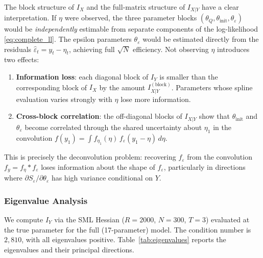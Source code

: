 \documentclass[12pt]{article}
\begin{document}
The block structure of $I_X$ and the full-matrix structure of $I_{X|Y}$
have a clear interpretation.
If $\eta$ were observed, the three parameter blocks
$(\theta_Q, \theta_{\text{init}}, \theta_\varepsilon)$ would be
\emph{independently} estimable from separate components of the
log-likelihood \eqref{eq:complete_ll}.
The epsilon parameters $\theta_\varepsilon$ would be estimated directly
from the residuals $\hat\varepsilon_t = y_t - \eta_t$, achieving full
$\sqrt{N}$ efficiency.
Not observing $\eta$ introduces two effects:
\begin{enumerate}
\item \textbf{Information loss}: each diagonal block of $I_Y$ is
  smaller than the corresponding block of $I_X$ by the amount
  $I_{X|Y}^{(\text{block})}$.
  Parameters whose spline evaluation varies strongly with $\eta$
  lose more information.
\item \textbf{Cross-block correlation}: the off-diagonal blocks of
  $I_{X|Y}$ show that $\theta_{\text{init}}$ and $\theta_\varepsilon$
  become correlated through the shared uncertainty about $\eta_1$
  in the convolution $f(y_1) = \int f_{\eta_1}(\eta)\, f_\varepsilon(y_1 - \eta)\, d\eta$.
\end{enumerate}

This is precisely the deconvolution problem: recovering $f_\varepsilon$
from the convolution $f_y = f_\eta * f_\varepsilon$ loses information
about the shape of $f_\varepsilon$, particularly in directions where
$\partial S_\varepsilon / \partial \theta_\varepsilon$ has high variance
conditional on $Y$.

\subsubsection*{Eigenvalue Analysis}

We compute $I_Y$ via the SML Hessian ($R = 2000$, $N = 300$, $T = 3$)
evaluated at the true parameter for the full (17-parameter) model.
The condition number is $2{,}810$, with all eigenvalues positive.
Table~\ref{tab:eigenvalues} reports the eigenvalues and their principal
directions.
\end{document}
